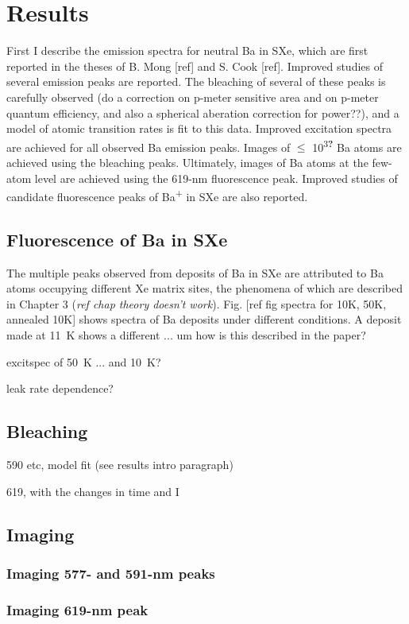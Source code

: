 \chapter{Results}

First I describe the emission spectra for neutral Ba in SXe, which are first reported in the theses of B. Mong [ref] and S. Cook [ref].  Improved studies of several emission peaks are reported.  The bleaching of several of these peaks is carefully observed ({\color{red}do a correction on p-meter sensitive area and on p-meter quantum efficiency, and also a spherical aberation correction for power??}), and a model of atomic transition rates is fit to this data.  Improved excitation spectra are achieved for all observed Ba emission peaks.  Images of $\leq$ 10\textsuperscript{3\textbf{?}} Ba atoms are achieved using the bleaching peaks.  Ultimately, images of Ba atoms at the few-atom level are achieved using the 619-nm fluorescence peak.  Improved studies of candidate fluorescence peaks of Ba\textsuperscript{+} in SXe are also reported.  

\section{Fluorescence of Ba in SXe}

The multiple peaks observed from deposits of Ba in SXe are attributed to Ba atoms occupying different Xe matrix sites, the phenomena of which are described in Chapter 3 {\color{red}(\emph{ref chap theory doesn't work})}.  Fig. [ref fig spectra for 10K, 50K, annealed 10K] shows spectra of Ba deposits under different conditions.  A deposit made at 11~K shows a different ... um how is this described in the paper?

excitspec of 50~K ... and 10~K?

leak rate dependence?

\section{Bleaching}

590 etc, model fit (see results intro paragraph)

619, with the changes in time and I

\section{Imaging}

\subsection{Imaging 577- and 591-nm peaks}

\subsection{Imaging 619-nm peak}